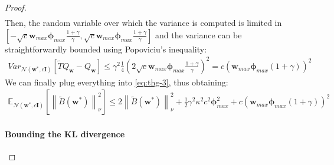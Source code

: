 \documentclass{article}
\newcommand{\wt}[1]{\widetilde{#1}}
\newcommand{\norm}[1]{\left\lVert #1 \right\rVert}
\begin{document}
\begin{proof}
\begin{align*}
\end{align*}
Then, the random variable over which the variance is computed is limited in $[-\sqrt{c}\bm{w}_{max}\bm{\phi}_{max}\frac{1 + \gamma}{\gamma},\sqrt{c}\bm{w}_{max}\bm{\phi}_{max}\frac{1 + \gamma}{\gamma}]$ and the variance can be straightforwardly bounded using Popoviciu's inequality:
\begin{align*}
Var_{\mathcal{N}(\bm{w}^*,c\bm{I})}\left[\wt{T}Q_{\bm{w}}-Q_{\bm{w}}\right] \leq \gamma^2 \frac{1}{4}\left(2\sqrt{c}\bm{w}_{max}\bm{\phi}_{max}\frac{1 + \gamma}{\gamma}\right)^2 = c\left(\bm{w}_{max}\bm{\phi}_{max}(1 + \gamma)\right)^2
\end{align*}
We can finally plug everything into \ref{eq:thg-3}, thus obtaining:
\begin{align*}
\mathbb{E}_{\mathcal{N}(\bm{w}^*,c\bm{I})}\left[\norm{\wt{B}(\bm{w}^*)}_{\nu}^2\right] \leq 2\norm{\wt{B}(\bm{w}^{*})}_{\nu}^2 + \frac{1}{2}\gamma^2\kappa^2 c^2\bm{\phi}_{max}^2 + c\left(\bm{w}_{max}\bm{\phi}_{max}(1 + \gamma)\right)^2
\end{align*}

\paragraph*{Bounding the KL divergence}


\end{proof}
\end{document}
